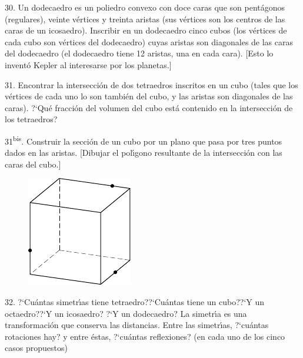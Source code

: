 \begin{problem}{30.}
	Un dodecaedro es un poliedro convexo con doce caras que son pent\'agonos (regulares), veinte v\'ertices y treinta aristas
	(sus v\'ertices son los centros de las caras de un icosaedro).
	Inscribir en un dodecaedro cinco cubos (los v\'ertices de cada cubo son v\'ertices del dodecaedro)
	cuyas aristas son diagonales de las caras del dodecaedro (el dodecaedro tiene 12 aristas, una en cada cara).
	[Esto lo invent\'o Kepler al interesarse por los planetas.] 
\end{problem}

\begin{problem}{31.}
	Encontrar la intersecci\'on de dos tetraedros inscritos en un cubo (tales que los v\'ertices de cada uno lo son tambi\'en del cubo, y las aristas son diagonales de las caras). 
	?`Qu\'e fracci\'on del volumen del cubo est\'a contenido en la intersecci\'on de los tetraedros?
\end{problem}

\begin{problem}{31\textsuperscript{bis}.}
	Construir la secci\'on de un cubo por un plano que pasa por tres puntos dados en las aristas.
	[Dibujar el pol\'{\i}gono resultante de la intersecci\'on con las caras del cubo.]
	\begin{figure}
		\includegraphics{taskbook-15}
	\end{figure}
\end{problem}

\begin{problem}{32.}
	?`Cu\'antas simetr\'{\i}as tiene tetraedro??`Cu\'antas tiene un cubo??`Y un octaedro??`Y un icosaedro? ?`Y un dodecaedro? La simetr\'{\i}a es una transformaci\'on que conserva las distancias.
	Entre las simetr\'{\i}as, ?`cu\'antas rotaciones hay? y entre \'estas, ?`cu\'antas reflexiones? (en cada uno de los cinco casos propuestos)
\end{problem}

